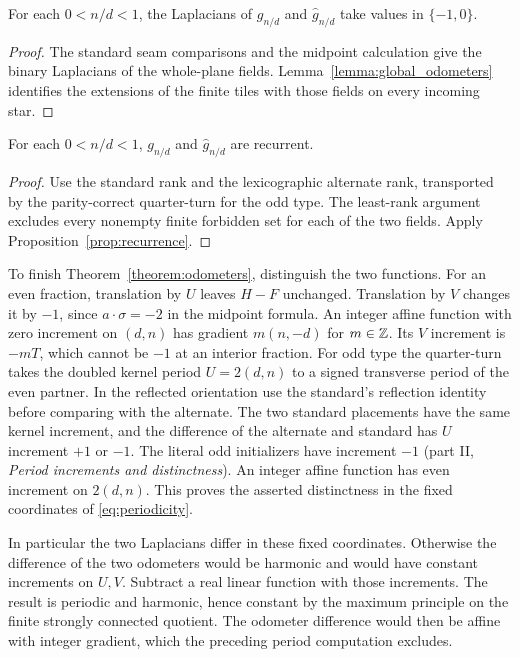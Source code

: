 \begin{lemma}
For each $0<n/d<1$, the Laplacians of $g_{n/d}$ and $\hat g_{n/d}$ take values in $\{-1,0\}$.
\end{lemma}
\begin{proof}
The standard seam comparisons and the midpoint calculation give the binary Laplacians of the whole-plane fields. Lemma~\ref{lemma:global_odometers} identifies the extensions of the finite tiles with those fields on every incoming star.
\end{proof}

\begin{lemma}
For each $0<n/d<1$, $g_{n/d}$ and $\hat g_{n/d}$ are recurrent.
\end{lemma}
\begin{proof}
Use the standard rank and the lexicographic alternate rank, transported by the parity-correct quarter-turn for the odd type. The least-rank argument excludes every nonempty finite forbidden set for each of the two fields. Apply Proposition~\ref{prop:recurrence}.
\end{proof}

To finish Theorem~\ref{theorem:odometers}, distinguish the two functions.
For an even fraction, translation by $U$ leaves $H-F$ unchanged. Translation by $V$ changes it by $-1$, since $a\cdot\sigma=-2$ in the midpoint formula. An integer affine function with zero increment on $(d,n)$ has gradient $m(n,-d)$ for $m\in\mathbb{Z}$. Its $V$ increment is $-mT$, which cannot be $-1$ at an interior fraction. For odd type the quarter-turn takes the doubled kernel period $U=2(d,n)$ to a signed transverse period of the even partner. In the reflected orientation use the standard's reflection identity before comparing with the alternate. The two standard placements have the same kernel increment, and the difference of the alternate and standard has $U$ increment $+1$ or $-1$. The literal odd initializers have increment $-1$ (part II, \emph{Period increments and distinctness}). An integer affine function has even increment on $2(d,n)$. This proves the asserted distinctness in the fixed coordinates of \eqref{eq:periodicity}.


In particular the two Laplacians differ in these fixed coordinates. Otherwise the difference of the two odometers would be harmonic and would have constant increments on $U,V$. Subtract a real linear function with those increments. The result is periodic and harmonic, hence constant by the maximum principle on the finite strongly connected quotient. The odometer difference would then be affine with integer gradient, which the preceding period computation excludes.
